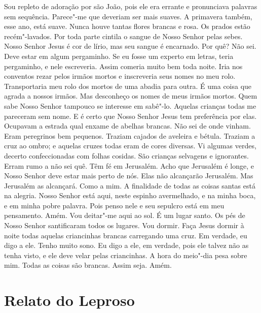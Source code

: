 Sou repleto de adoração por são João, pois ele era errante e pronunciava
palavras sem sequência. Parece"-me que deveriam ser mais suaves. A
primavera também, esse ano, está suave. Nunca houve tantas flores brancas
e rosa. Os prados estão recém"-lavados. Por toda parte cintila o sangue de
Nosso Senhor pelas sebes. Nosso Senhor Jesus é cor de lírio, mas seu
sangue é encarnado. Por quê? Não sei. Deve estar em algum pergaminho. Se
eu fosse um experto em letras, teria pergaminho, e nele escreveria. Assim
comeria muito bem toda noite. Iria nos conventos rezar pelos irmãos mortos
e inscreveria seus nomes no meu rolo. Transportaria meu rolo dos mortos de
uma abadia para outra. É uma coisa que agrada a nossos irmãos. Mas
desconheço os nomes de meus irmãos mortos. Quem sabe Nosso Senhor tampouco
se interesse em sabê"-lo. Aquelas crianças todas me pareceram sem nome. E é
certo que Nosso Senhor Jesus tem preferência por elas. Ocupavam a estrada
qual enxame de abelhas brancas. Não sei de onde vinham. Eram peregrinos
bem pequenos. Traziam cajados de aveleira e bétula. Traziam a cruz ao
ombro; e aquelas cruzes todas eram de cores diversas. Vi algumas verdes,
decerto confeccionadas com folhas cosidas. São crianças selvagens e
ignorantes. Erram rumo a não sei quê. Têm fé em Jerusalém. Acho que
Jerusalém é longe, e Nosso Senhor deve estar mais perto de nós. Elas não
alcançarão Jerusalém. Mas Jerusalém as alcançará. Como a mim. A finalidade
de todas as coisas santas está na alegria. Nosso Senhor está aqui, neste
espinho avermelhado, e na minha boca, e em minha pobre palavra. Pois penso
nele e seu sepulcro está em meu pensamento. Amém. Vou deitar"-me aqui ao
sol. É um lugar santo. Os pés de Nosso Senhor santificaram todos os
lugares. Vou dormir. Faça Jesus dormir à noite todas aquelas criancinhas
brancas carregando uma cruz. Em verdade, eu digo a ele. Tenho muito sono.
Eu digo a ele, em verdade, pois ele talvez não as tenha visto, e ele deve
velar pelas criancinhas. A hora do meio"-dia pesa sobre mim. Todas as
coisas são brancas. Assim seja. Amém.

\chapter{Relato do Leproso}

